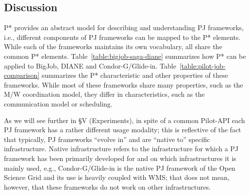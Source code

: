 \documentclass[conference]{IEEEtran}
\begin{document}
\subsection{Discussion}

P* provides an abstract model for describing and understanding PJ
frameworks, i.e., different components of PJ frameworks can be mapped
to the P* elements.  While each of the frameworks maintains its own
vocabulary, all share the common P* elements.
Table~\ref{table:bigjob-saga-diane} summarizes how P* can be applied
to BigJob, DIANE and Condor-G/Glide-in.
Table~\ref{table:pilot-job-comparison} summarizes the P*
characteristic and other properties of these frameworks. While most of
these frameworks share many properties, such as the M/W coordination
model, they differ in characteristics, such as the communication model
or scheduling. 

As we will see further in \S V (Experiments), in spite of a common
Pilot-API each PJ framework has a rather different usage modality;
this is reflective of the fact that typically, PJ frameworks ``evolve
in'' and are ``native to'' specific infrastructure. Native
infrastructure refers to the infrastructure for which a PJ framework
has been primarily developed for and on which infrastructures it is
mainly used, e.g., Condor-G/Glide-in is the native PJ framework of the
Open Science Grid and its use is heavily coupled with WMS; that does
not mean, however, that these frameworks do not work on other
infrastructures. 






\end{document}
